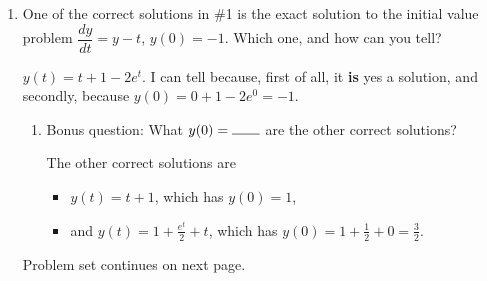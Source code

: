 \documentclass[10pt]{article}
\newenvironment{red}{\color{red}}{\ignorespacesafterend}
\begin{document}
\begin{enumerate}[leftmargin=0pt]
\begin{enumerate}
\begin{red}
    The RHS of the differential equation is $y-t$, which in this case is $\left(2e^t\right)-t$. 
    
    So, this \textbf{is not a solution}, boo, because the LHS and the RHS \textbf{don't} match.
    \end{red}
    \item $y(t) = 1+\frac{e^t}{2}+t$
    
    \begin{red}
    The LHS of the differential equation is $\dfrac{dy}{dt}$, which in this case is $0 + \frac{e^t}{2}+1$. 
    
    The RHS of the differential equation is $y-t$, which in this case is $\left(1+\frac{e^t}{2}+t\right)-t = 1+\frac{e^t}{2}$. 
    
    So, this \textbf{is a solution}, yay, because the LHS and the RHS match.
    \end{red}
\end{enumerate}

\item One of the correct solutions in \#1 is the exact solution to the initial value problem $\dfrac{dy}{dt} = y-t$, $y(0) = -1$. Which one, and how can you tell?

\begin{red}
$y(t) = t + 1 - 2e^t$. I can tell because, first of all, it \textbf{is} yes a solution, and secondly, because $y(0) = 0 + 1 - 2e^0 = -1$.
\end{red}
\begin{enumerate}
    \item Bonus question: What $y(0) = \rule{0.7cm}{0.15mm}$ are the other correct solutions?

    \begin{red}
        The other correct solutions are 
        \begin{itemize}
            \item $y(t) = t + 1$, which has $y(0) = 1$,
            \item and $y(t) = 1+\frac{e^t}{2}+t$, which has $y(0) = 1 + \frac12 + 0 = \frac32$.
        \end{itemize}
    \end{red}
\end{enumerate}

Problem set continues on next page.

\pagebreak


\end{enumerate}
\end{document}
